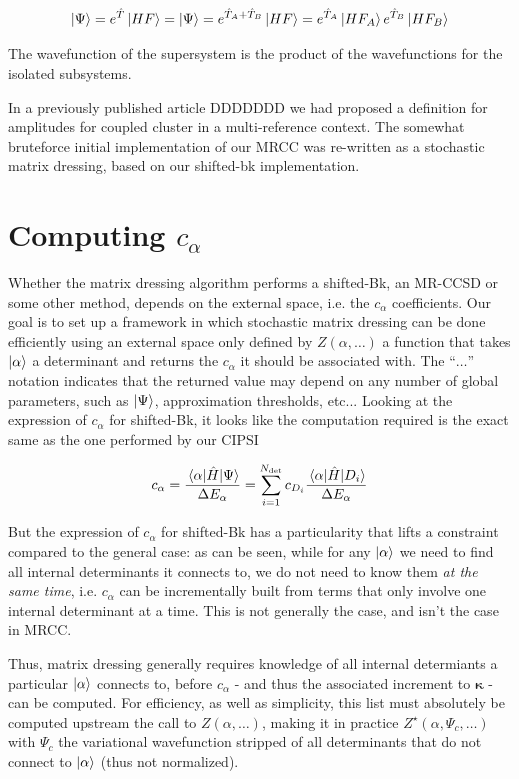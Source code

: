 \documentclass[./thesis.tex]{subfiles}
\begin{document}
\begin{equation}
\ket \Psi = e^{\hat T} \ket {HF} = \ket \Psi = e^{\hat T_A + \hat T_B} \ket {HF} = e^{\hat T_A} \ket {HF_A} e^{\hat T_B} \ket {HF_B}
\end{equation}

The wavefunction of the supersystem is the product of the wavefunctions for the isolated subsystems.


In a previously published article \alert{DDDDDDD} we had proposed a definition for amplitudes for coupled cluster in a multi-reference context. The somewhat bruteforce initial implementation of our MRCC was re-written as a stochastic matrix dressing, based on our shifted-bk implementation.

\section{Computing $c_\alpha$}
Whether the matrix dressing algorithm performs a shifted-Bk, an MR-CCSD or some other method, depends on the external space, i.e. the $c_\alpha$ coefficients. Our goal is to set up a framework in which stochastic matrix dressing can be done efficiently using an external space only defined by $Z(\alpha, \ldots)$ a function that takes ${\ket{\alpha}}$ a determinant and returns the $c_\alpha$ it should be associated with. The ``$\ldots$'' notation indicates that the returned value may depend on any number of global parameters, such as $\ket \Psi$, approximation thresholds, etc...
Looking at the expression of $c_\alpha$ for shifted-Bk, it looks like the computation required is the exact same as the one performed by our CIPSI

\begin{equation}
c_\alpha = \frac{\mel{\alpha}{\hat{H}}{\Psi}}{\Delta E_\alpha} = \sum_{i=1}^{{N_\text{det}}} c_{D_i} \frac{\mel{\alpha}{\hat{H}}{D_i}}{\Delta E_\alpha}
\end{equation}


But the expression of $c_\alpha$ for shifted-Bk has a particularity that lifts a constraint compared to the general case: as can be seen, while for any ${\ket{\alpha}}$ we need to find all internal determinants it connects to, we do not need to know them \emph{at the same time}, i.e. $c_\alpha$ can be incrementally built from terms that only involve one internal determinant at a time. This is not generally the case, and isn't the case in MRCC.

Thus, matrix dressing generally requires knowledge of all internal determiants a particular ${\ket{\alpha}}$ connects to, before $c_\alpha$ - and thus the associated increment to $\pmb \kappa$ - can be computed. For efficiency, as well as simplicity, this list must absolutely be computed upstream the call to $Z(\alpha, \ldots)$, making it in practice $Z^\star(\alpha, \Psi_{c}, \ldots)$ with $\Psi_{c}$ the variational wavefunction stripped of all determinants that do not connect to ${\ket{\alpha}}$ (thus not normalized). 
\end{document}
